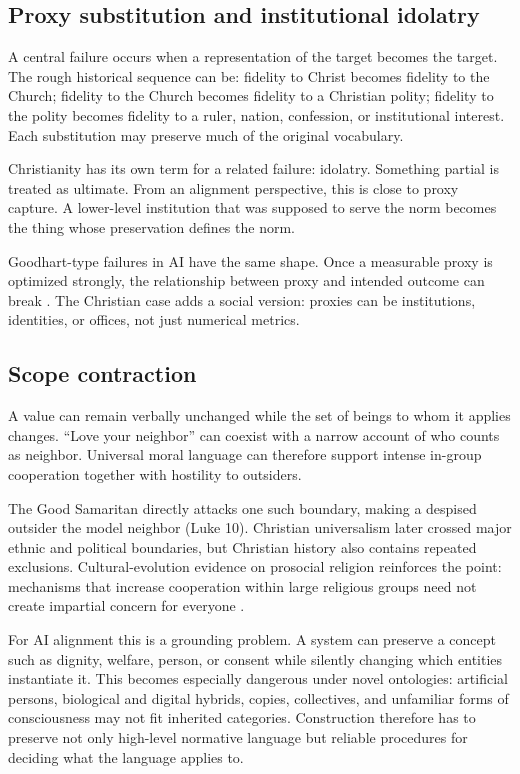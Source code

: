 \documentclass[11pt]{article}
\begin{document}
\subsection{Proxy substitution and institutional idolatry}

A central failure occurs when a representation of the target becomes the target. The rough historical sequence can be: fidelity to Christ becomes fidelity to the Church; fidelity to the Church becomes fidelity to a Christian polity; fidelity to the polity becomes fidelity to a ruler, nation, confession, or institutional interest. Each substitution may preserve much of the original vocabulary.

Christianity has its own term for a related failure: idolatry. Something partial is treated as ultimate. From an alignment perspective, this is close to proxy capture. A lower-level institution that was supposed to serve the norm becomes the thing whose preservation defines the norm.

Goodhart-type failures in AI have the same shape. Once a measurable proxy is optimized strongly, the relationship between proxy and intended outcome can break \parencite{manheim2019goodhart}. The Christian case adds a social version: proxies can be institutions, identities, or offices, not just numerical metrics.

\subsection{Scope contraction}

A value can remain verbally unchanged while the set of beings to whom it applies changes. ``Love your neighbor'' can coexist with a narrow account of who counts as neighbor. Universal moral language can therefore support intense in-group cooperation together with hostility to outsiders.

The Good Samaritan directly attacks one such boundary, making a despised outsider the model neighbor (Luke 10). Christian universalism later crossed major ethnic and political boundaries, but Christian history also contains repeated exclusions. Cultural-evolution evidence on prosocial religion reinforces the point: mechanisms that increase cooperation within large religious groups need not create impartial concern for everyone \parencite{norenzayan2016prosocial,purzycki2016moralistic}.

For AI alignment this is a grounding problem. A system can preserve a concept such as dignity, welfare, person, or consent while silently changing which entities instantiate it. This becomes especially dangerous under novel ontologies: artificial persons, biological and digital hybrids, copies, collectives, and unfamiliar forms of consciousness may not fit inherited categories. Construction therefore has to preserve not only high-level normative language but reliable procedures for deciding what the language applies to.
\end{document}
